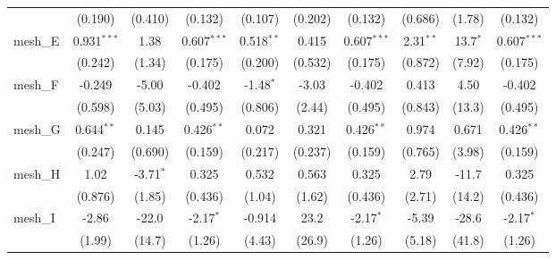 \begin{tabular}{lccccccccc}
                                                               & (0.190)        & (0.410)       & (0.132)        & (0.107)        & (0.202)      & (0.132)        & (0.686)        & (1.78)        & (0.132)\\   
   mesh\_E                                                     & 0.931$^{***}$  & 1.38          & 0.607$^{***}$  & 0.518$^{**}$   & 0.415        & 0.607$^{***}$  & 2.31$^{**}$    & 13.7$^{*}$    & 0.607$^{***}$\\   
                                                               & (0.242)        & (1.34)        & (0.175)        & (0.200)        & (0.532)      & (0.175)        & (0.872)        & (7.92)        & (0.175)\\   
   mesh\_F                                                     & -0.249         & -5.00         & -0.402         & -1.48$^{*}$    & -3.03        & -0.402         & 0.413          & 4.50          & -0.402\\   
                                                               & (0.598)        & (5.03)        & (0.495)        & (0.806)        & (2.44)       & (0.495)        & (0.843)        & (13.3)        & (0.495)\\   
   mesh\_G                                                     & 0.644$^{**}$   & 0.145         & 0.426$^{**}$   & 0.072          & 0.321        & 0.426$^{**}$   & 0.974          & 0.671         & 0.426$^{**}$\\   
                                                               & (0.247)        & (0.690)       & (0.159)        & (0.217)        & (0.237)      & (0.159)        & (0.765)        & (3.98)        & (0.159)\\   
   mesh\_H                                                     & 1.02           & -3.71$^{*}$   & 0.325          & 0.532          & 0.563        & 0.325          & 2.79           & -11.7         & 0.325\\   
                                                               & (0.876)        & (1.85)        & (0.436)        & (1.04)         & (1.62)       & (0.436)        & (2.71)         & (14.2)        & (0.436)\\   
   mesh\_I                                                     & -2.86          & -22.0         & -2.17$^{*}$    & -0.914         & 23.2         & -2.17$^{*}$    & -5.39          & -28.6         & -2.17$^{*}$\\   
                                                               & (1.99)         & (14.7)        & (1.26)         & (4.43)         & (26.9)       & (1.26)         & (5.18)         & (41.8)        & (1.26)\\   

\end{tabular}
